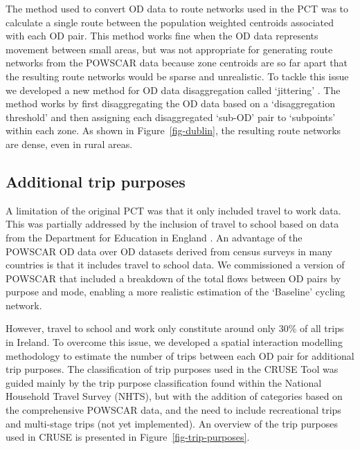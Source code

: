 \documentclass[
  super,
  preprint,
  3p]{elsarticle}
\begin{document}
The method used to convert OD data to route networks used in the PCT was
to calculate a single route between the population weighted centroids
associated with each OD pair. This method works fine when the OD data
represents movement between small areas, but was not appropriate for
generating route networks from the POWSCAR data because zone centroids
are so far apart that the resulting route networks would be sparse and
unrealistic. To tackle this issue we developed a new method for OD data
disaggregation called `jittering' \citep{lovelace2022}. The method works
by first disaggregating the OD data based on a `disaggregation
threshold' and then assigning each disaggregated `sub-OD' pair to
`subpoints' within each zone. As shown in Figure~\ref{fig-dublin}, the
resulting route networks are dense, even in rural areas.

\hypertarget{sec-trip-purposes}{%
\subsection{Additional trip purposes}\label{sec-trip-purposes}}

A limitation of the original PCT was that it only included travel to
work data. This was partially addressed by the inclusion of travel to
school based on data from the Department for Education in England
\citep{goodman2019}. An advantage of the POWSCAR OD data over OD
datasets derived from census surveys in many countries is that it
includes travel to school data. We commissioned a version of POWSCAR
that included a breakdown of the total flows between OD pairs by purpose
and mode, enabling a more realistic estimation of the `Baseline' cycling
network.

However, travel to school and work only constitute around only 30\% of
all trips in Ireland. To overcome this issue, we developed a spatial
interaction modelling methodology to estimate the number of trips
between each OD pair for additional trip purposes. The classification of
trip purposes used in the CRUSE Tool was guided mainly by the trip
purpose classification found within the National Household Travel Survey
(NHTS), but with the addition of categories based on the comprehensive
POWSCAR data, and the need to include recreational trips and multi-stage
trips (not yet implemented). An overview of the trip purposes used in
CRUSE is presented in Figure~\ref{fig-trip-purposes}.
\end{document}
